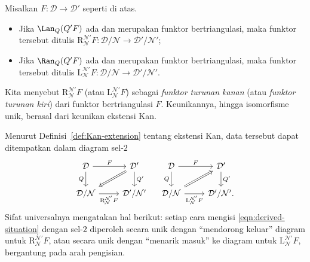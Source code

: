 \begin{definisi}\label{def:Verdier-localization-functor}
	Misalkan $F: \mathcal{D} \to \mathcal{D}'$ seperti di atas.
	\begin{itemize}
		\item Jika $\Lan_Q(Q' F)$ ada dan merupakan funktor bertriangulasi, maka
		funktor tersebut ditulis
		$\mathrm{R}^{\mathcal{N}'}_{\mathcal{N}} F:
		\mathcal{D}/\mathcal{N} \to \mathcal{D}'/\mathcal{N}'$;
		\item Jika $\Ran_Q(Q' F)$ ada dan merupakan funktor bertriangulasi, maka
		funktor tersebut ditulis
		$\mathrm{L}^{\mathcal{N}'}_{\mathcal{N}} F:
		\mathcal{D}/\mathcal{N} \to \mathcal{D}'/\mathcal{N}'$.
	\end{itemize}
	Kita menyebut $\mathrm{R}^{\mathcal{N}'}_{\mathcal{N}} F$ (atau
	$\mathrm{L}^{\mathcal{N}'}_{\mathcal{N}} F$) sebagai \emph{funktor turunan
	kanan} (atau \emph{funktor turunan kiri}) dari funktor bertriangulasi $F$.
	Keunikannya, hingga isomorfisme unik, berasal dari keunikan ekstensi Kan.
\end{definisi}

Menurut Definisi~\ref{def:Kan-extension} tentang ekstensi Kan, data tersebut
dapat ditempatkan dalam diagram sel-$2$
\begin{equation}\label{eqn:derived-can-morphism}\begin{tikzcd}
	\mathcal{D} \arrow[r, "F"] \arrow[d, "Q"'] & \mathcal{D}' \arrow[d, "{Q'}"] \arrow[Rightarrow, ld] \\
	\mathcal{D}/\mathcal{N} \arrow[r, "{\mathrm{R}^{\mathcal{N}'}_{\mathcal{N}} F}"'] & \mathcal{D}'/\mathcal{N}'
\end{tikzcd} \quad \begin{tikzcd}
	\mathcal{D} \arrow[r, "F"] \arrow[d, "Q"'] & \mathcal{D}' \arrow[d, "{Q'}"] \\
	\mathcal{D}/\mathcal{N} \arrow[r, "{\mathrm{L}^{\mathcal{N}'}_{\mathcal{N}} F}"'] \arrow[Rightarrow, ru] & \mathcal{D}'/\mathcal{N}' .
\end{tikzcd}\end{equation}
Sifat universalnya mengatakan hal berikut: setiap cara mengisi
\eqref{eqn:derived-situation} dengan sel-$2$ diperoleh secara unik dengan
``mendorong keluar'' diagram untuk
$\mathrm{R}^{\mathcal{N}'}_{\mathcal{N}}F$, atau secara unik dengan
``menarik masuk'' ke diagram untuk
$\mathrm{L}^{\mathcal{N}'}_{\mathcal{N}}F$, bergantung pada arah pengisian.

